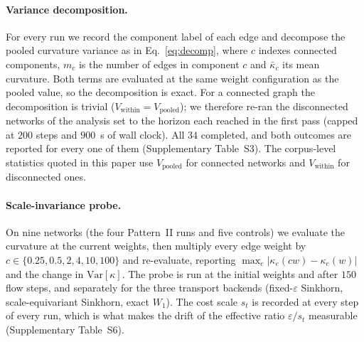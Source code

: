 \documentclass[11pt]{article}
\newcommand{\Var}{\mathrm{Var}}
\begin{document}
\paragraph{Variance decomposition.} For every run we record the component
label of each edge and decompose the pooled curvature variance as in
Eq.~\eqref{eq:decomp}, where $c$ indexes connected components, $m_c$ is the
number of edges in component $c$ and $\bar\kappa_c$ its mean curvature. Both
terms are evaluated at the same weight configuration as the pooled value, so
the decomposition is exact. For a connected graph the decomposition is trivial
($V_{\mathrm{within}}=V_{\mathrm{pooled}}$); we therefore re-ran the
disconnected networks of the analysis set to the horizon each reached in the
first pass (capped at $200$ steps and $900$~s of wall clock). All $34$ completed, and both
outcomes are reported for every one of them (Supplementary Table~S3). The corpus-level
statistics quoted in this paper use $V_{\mathrm{pooled}}$ for connected
networks and $V_{\mathrm{within}}$ for disconnected ones.

\paragraph{Scale-invariance probe.} On nine networks (the four
Pattern~II runs and five controls) we evaluate the curvature at the
current weights, then multiply every edge weight by
$c\in\{0.25,0.5,2,4,10,100\}$ and re-evaluate, reporting
$\max_e|\kappa_e(cw)-\kappa_e(w)|$ and the change in $\Var[\kappa]$. The probe
is run at the initial weights and after $150$ flow steps, and separately for
the three transport backends (fixed-$\varepsilon$ Sinkhorn, scale-equivariant
Sinkhorn, exact $W_1$). The cost scale $s_t$ is recorded at every step of
every run, which is what makes the drift of the effective ratio
$\varepsilon/s_t$ measurable (Supplementary Table~S6).
\end{document}
